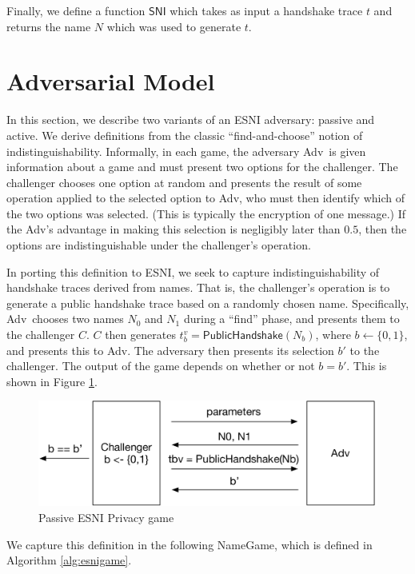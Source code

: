 \documentclass{article}
\newcommand{\adv}{{\sf Adv}}
\theoremstyle{definition}
\begin{document}
Finally, we define a function $\mathsf{SNI}$ which takes as input a handshake trace $t$
and returns the name $N$ which was used to generate $t$. 

\section{Adversarial Model}

In this section, we describe two variants of an ESNI adversary: passive and active. We derive 
definitions from the classic ``find-and-choose'' notion of indistinguishability. Informally, 
in each game, the adversary \adv\ is given information about a game and must present two options
for the challenger. The challenger chooses one option at random and presents the result of some 
operation applied to the selected option to \adv, who must then identify which of 
the two options was selected. (This is typically the encryption of one message.) If the 
\adv's advantage in making this selection is negligibly later than $0.5$, then the options 
are indistinguishable under the challenger's operation.

In porting this definition to ESNI, we seek to capture indistinguishability of handshake traces
derived from names. That is, the challenger's operation is to generate a public handshake trace 
based on a randomly chosen name. Specifically, \adv\ chooses two names $N_0$ and $N_1$ during
a ``find'' phase, and presents them to the challenger $C$. $C$ then generates 
$t_b^v = \mathsf{PublicHandshake}(N_b)$, where $b \gets \{0,1\}$, and presents this to \adv. 
The adversary then presents its selection $b'$ to the challenger. The output of the game
depends on whether or not $b = b'$. This is shown in Figure \ref{fig:passive-game}.

\begin{figure}
    \centering
    \includegraphics[scale=0.7]{esni_game.pdf}
    \caption{Passive ESNI Privacy game}
    \label{fig:passive-game}
\end{figure}

We capture this definition in the following {\sf NameGame}, which is defined in Algorithm \ref{alg:esnigame}.
\end{document}

